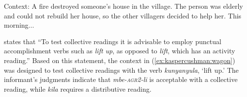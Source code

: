 \documentclass[output=paper,modfonts,nonflat]{langsci/langscibook}
\begin{document}
\begin{exe}

 \ex Context: A fire destroyed someone's house in the village. The person was elderly and could not rebuild her house, so the other villagers decided to help her. This morning... 

\begin{xlist}



\end{xlist}
\end{exe}


\citealt[121]{szabolcsi10} states that ``To test collective readings it is advisable to employ punctual accomplishment verbs such as \textit{lift up}, as opposed to \emph{lift}, which has an activity reading.'' Based on this statement, the context in (\ref{ex:kaspercushman:wagon}) was designed to test collective readings with the verb \textit{kunyanyula}, `lift up.' The informant's judgments indicate that  \textit{mbe-\textsc{agr2}-li} is acceptable with a collective reading, while \textit{kila} requires a distributive reading. 
\end{document}
